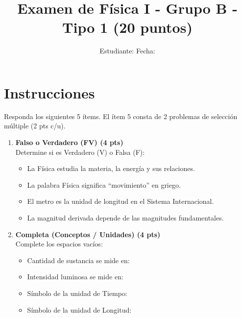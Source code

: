 \documentclass[a4paper,12pt]{article}
\title{Examen de Física I - Grupo B - Tipo 1 (20 puntos)}
\author{Estudiante: \underline{\hspace{6cm}} \quad Fecha: \underline{\hspace{3cm}}}
\date{}
\begin{document}
\maketitle

\section*{Instrucciones}
Responda los siguientes 5 ítems. El ítem 5 consta de 2 problemas de selección múltiple (2 pts c/u).

\begin{enumerate}[label=\textbf{Item \arabic*:}, leftmargin=*]

    \item \textbf{Falso o Verdadero (FV) (4 pts)} \\
    Determine si es Verdadero (V) o Falsa (F):
    \begin{itemize}
        \item[\underline{\hspace{1cm}}] La Física estudia la materia, la energía y sus relaciones.
        \item[\underline{\hspace{1cm}}] La palabra Física significa ``movimiento'' en griego.
        \item[\underline{\hspace{1cm}}] El metro es la unidad de longitud en el Sistema Internacional.
        \item[\underline{\hspace{1cm}}] La magnitud derivada depende de las magnitudes fundamentales.
    \end{itemize}

    \item \textbf{Completa (Conceptos / Unidades) (4 pts)} \\
    Complete los espacios vacíos:
    \begin{itemize}
        \item Cantidad de sustancia se mide en: \underline{\hspace{3cm}}
        \item Intensidad luminosa se mide en: \underline{\hspace{3cm}}
        \item Símbolo de la unidad de Tiempo: \underline{\hspace{3cm}}
        \item Símbolo de la unidad de Longitud: \underline{\hspace{3cm}}
    \end{itemize}


\end{enumerate}
\end{document}
